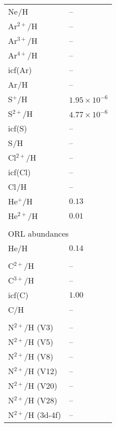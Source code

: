\begin{longtable}[l]{ll}
 Ne$^{}$/H                           & -- \\
 Ar$^{2+}$/H                         & -- \\
 Ar$^{3+}$/H                         & -- \\
 Ar$^{4+}$/H                         & -- \\
 icf(Ar)                             & -- \\
 Ar$^{}$/H                           & -- \\
 S$^{+}$/H                           & $  1.95\times 10^{ -6}$\\
 S$^{2+}$/H                          & $  4.77\times 10^{ -6}$\\
 icf(S)                              & -- \\
 S$^{}$/H                            & -- \\
 Cl$^{2+}$/H                         & -- \\
 icf(Cl)                             & -- \\
 Cl$^{}$/H                           & -- \\
 He$^{+}$/H                          & $  0.13$\\
 He$^{2+}$/H                         & $  0.01$\\
 \vspace{0.2cm}\\\multicolumn{2}{l}{ORL abundances}\\ \hline
 He/H                                & $  0.14$\\
 \\
 C$^{2+}$/H                          & -- \\
 C$^{3+}$/H                          & -- \\
 icf(C)                              & $  1.00$\\
 C/H                                 & -- \\
 \\
 N$^{2+}$/H (V3)                     & -- \\
 N$^{2+}$/H (V5)                     & -- \\
 N$^{2+}$/H (V8)                     & -- \\
 N$^{2+}$/H (V12)                    & -- \\
 N$^{2+}$/H (V20)                    & -- \\
 N$^{2+}$/H (V28)                    & -- \\
 N$^{2+}$/H (3d-4f)                  & -- \\

\end{longtable}

